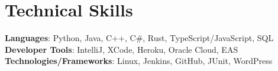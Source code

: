 \documentclass[letterpaper,11pt]{article}
\makeatletter
\newcommand{\resumeItem}[1]{
  \item\small{
    {#1 \vspace{-2pt}}
  }
}
\newcommand{\resumeSubheading}[4]{
  \vspace{-2pt}\item
    \begin{tabular*}{1.0\textwidth}[t]{l@{\extracolsep{\fill}}r}
      \textbf{#1} & \textbf{\small #2} \\
      \textit{\small#3} & \textit{\small #4} \\
    \end{tabular*}\vspace{-7pt}
}
\newcommand{\resumeSubHeadingListStart}{\begin{itemize}[leftmargin=0.0in, label={}]}
\newcommand{\resumeSubHeadingListEnd}{\end{itemize}}
\newcommand{\resumeItemListStart}{\begin{itemize}}
\newcommand{\resumeItemListEnd}{\end{itemize}\vspace{-5pt}}
\makeatother
\begin{document}
\section{Technical Skills}
 \begin{itemize}[leftmargin=0.15in, label={}]
    \small{\item{
     \textbf{Languages}{: Python, Java, C++, C\#, Rust, TypeScript/JavaScript, SQL} \\
     \textbf{Developer Tools}{: IntelliJ, XCode, Heroku, Oracle Cloud, EAS} \\
     \textbf{Technologies/Frameworks}{: Linux, Jenkins, GitHub, JUnit, WordPress} \\
    }}
 \end{itemize}
 \vspace{-16pt}


        
\end{document}
